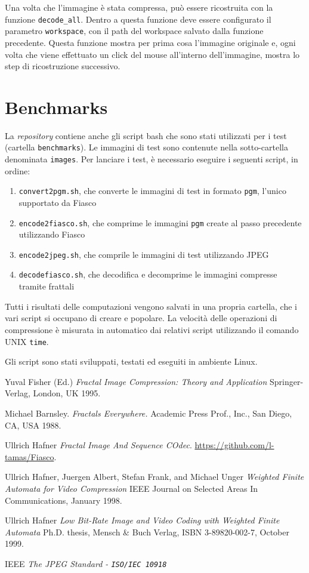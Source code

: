 \documentclass[11pt,a4paper,appendixprefix=true,numbers=noenddot]{scrreprt}
\begin{document}
Una volta che l'immagine è stata compressa, può essere ricostruita con la funzione \texttt{decode\_all}. Dentro a questa funzione deve essere configurato il parametro \texttt{workspace}, con il path del workspace salvato dalla funzione precedente. Questa funzione mostra per prima cosa l'immagine originale e, ogni volta che viene effettuato un click del mouse all'interno dell'immagine, mostra lo step di ricostruzione successivo.

\section{Benchmarks}

La \emph{repository} contiene anche gli script bash che sono stati utilizzati per i test (cartella \texttt{benchmarks}). Le immagini di test sono contenute nella sotto-cartella denominata \texttt{images}. Per lanciare i test, è necessario eseguire i seguenti script, in ordine:

\begin{enumerate}
\item \texttt{convert2pgm.sh}, che converte le immagini di test in formato \texttt{pgm}, l'unico supportato da Fiasco
\item \texttt{encode2fiasco.sh}, che comprime le immagini \texttt{pgm} create al passo precedente utilizzando Fiasco
\item \texttt{encode2jpeg.sh}, che comprile le immagini di test utilizzando JPEG
\item \texttt{decodefiasco.sh}, che decodifica e decomprime le immagini compresse tramite frattali
\end{enumerate}

Tutti i risultati delle computazioni vengono salvati in una propria cartella, che i vari script si occupano di creare e popolare. La velocità  delle operazioni di compressione è misurata in automatico dai relativi script utilizzando il comando UNIX \texttt{time}.

Gli script sono stati sviluppati, testati ed eseguiti in ambiente Linux.

\begin{thebibliography}{9}

Yuval Fisher (Ed.)
\textit{Fractal Image Compression: Theory and Application}
Springer-Verlag, London, UK 1995.

Michael Barnsley.
\textit{Fractals Everywhere.} 
Academic Press Prof., Inc., San Diego, CA, USA 1988.

Ullrich Hafner
\textit{Fractal Image And Sequence COdec}. 
\url{https://github.com/l-tamas/Fiasco}.
 
Ullrich Hafner, Juergen Albert, Stefan Frank, and Michael Unger
\textit{Weighted Finite Automata for Video Compression}
IEEE Journal on Selected Areas In Communications, January 1998.

Ullrich  Hafner
\textit{Low Bit-Rate Image and Video Coding with Weighted Finite Automata}
Ph.D. thesis, Mensch \& Buch Verlag, ISBN 3-89820-002-7, October 1999.

IEEE
\textit{The JPEG Standard - \texttt{ISO/IEC 10918}}

\end{thebibliography} 
\end{document}

